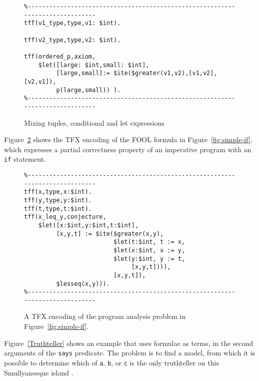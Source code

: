\documentclass{easychair}
\begin{document}
\begin{figure}[htbp]
\begin{small}
\begin{verbatim}
%------------------------------------------------------------------------------
tff(v1_type,type,v1: $int).

tff(v2_type,type,v2: $int).

tff(ordered_p,axiom,
    $let([large: $int,small: $int],
         [large,small]:= $ite($greater(v1,v2),[v1,v2],[v2,v1]),
         p(large,small)) ).
%------------------------------------------------------------------------------
\end{verbatim}
\end{small}
\caption{Mixing tuples, conditional and let expressions}
\label{TupleConditionalLet}
\end{figure}

Figure~\ref{LetITE} shows the TFX encoding of the FOOL formula in
Figure~\ref{fig:simple-if}, which expresses a partial correctness property 
of an imperative program with an \texttt{if} statement.

\begin{figure}[htbp]
\begin{small}
\begin{verbatim}
%------------------------------------------------------------------------------
tff(x,type,x:$int).
tff(y,type,y:$int).
tff(t,type,t:$int).
tff(x_leq_y,conjecture,
    $let([x:$int,y:$int,t:$int],
         [x,y,t] := $ite($greater(x,y),
                         $let(t:$int, t := x,
                         $let(x:$int, x := y,
                         $let(y:$int, y := t,
                              [x,y,t]))),
                         [x,y,t]),
         $lesseq(x,y))).
%------------------------------------------------------------------------------
\end{verbatim}
\end{small}
\caption{A TFX encoding of the program analysis problem in
Figure~\ref{fig:simple-if}.}
\label{LetITE}
\end{figure}

Figure~\ref{Truthteller} shows an example that uses formulae as terms, in
the second arguments of the {\tt says} predicate.
The problem is to find a model, from which it is possible to determine which
of {\tt a}, {\tt b}, or {\tt c} is the only truthteller on this
Smullyanesque island \cite{Smu78}.
\end{document}
